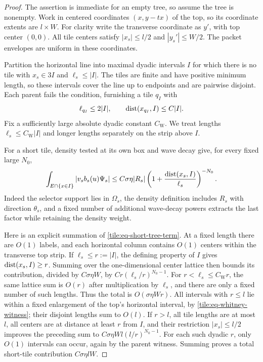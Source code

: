 \begin{proof}
The assertion is immediate for an empty tree, so assume
the tree is nonempty. Work in centered coordinates \((x,y-tx)\) of the
top, so its coordinate extents are \(l\times W\).
For clarity write the transverse coordinate as
\(y'\), with top center \((0,0)\).  All tile
centers satisfy \(|x_s|\leq l/2\) and
\(|y_s'|\leq W/2\).  The packet envelopes are
uniform in these coordinates.

Partition the horizontal line into maximal dyadic
intervals \(I\) for which there is no tile with
\(x_s\in3I\) and \(\ell_s\leq |I|\).  The tiles
are finite and have positive minimum length, so
these intervals cover the line up to endpoints
and are pairwise disjoint.  Each parent fails
the condition, furnishing a tile \(q_I\) with
\begin{equation}\label{tile:eq-whitney-witness}
 \ell_{q_I}\leq2|I|,\qquad
 \operatorname{dist}(x_{q_I},I)\leq C|I|.
\end{equation}
Fix a sufficiently large absolute dyadic constant
\(C_{\mathrm W}\).  We treat lengths
\(\ell_s\leq C_{\mathrm W}|I|\) and longer lengths
separately on the strip above \(I\).

For a short tile, density tested at its own box
and wave decay give, for every fixed large \(N_0\),
\begin{equation}\label{tile:eq-short-tree-term}
 \int_{E\cap\{x\in I\}}
     |v_s b_s(u)\Psi_s|
 \leq C\sigma\eta|R_s|
        \left(1+\frac{\operatorname{dist}(x_s,I)}{\ell_s}\right)^{-N_0}.
\end{equation}
Indeed the selector support lies in \(\Omega_s\),
the density definition includes \(R_s\) with
direction \(\theta_s\), and a fixed number of
additional wave-decay powers extracts the last
factor while retaining the density weight.

Here is an explicit summation of
\eqref{tile:eq-short-tree-term}.  At a fixed
length there are \(O(1)\) labels, and each
horizontal column contains \(O(1)\) centers
within the transverse top strip.  If
\(\ell_s\leq r:=|I|\), the defining property
of \(I\) gives \(\operatorname{dist}(x_s,I)\geq r\).
Summing over the one-dimensional center lattice
then bounds its contribution, divided by
\(C\sigma\eta W\), by
\(C r(\ell_s/r)^{N_0-1}\).
For \(r<\ell_s\leq C_{\mathrm W}r\), the same
lattice sum is \(O(r)\) after multiplication
by \(\ell_s\), and there are only a fixed
number of such lengths.  Thus the total is
\(O(\sigma\eta Wr)\).
All intervals with \(r\leq l\) lie within a
fixed enlargement of the top's horizontal
interval, by \eqref{tile:eq-whitney-witness};
their disjoint lengths sum to \(O(l)\).
If \(r>l\), all tile lengths are at most
\(l\), all centers are at distance at least
\(r\) from \(I\), and their restriction
\(|x_s|\leq l/2\) improves the preceding
sum to
\(C\sigma\eta Wl(l/r)^{N_0-1}\).
For each such dyadic \(r\), only \(O(1)\)
intervals can occur, again by the parent
witness.  Summing proves a total short-tile
contribution \(C\sigma\eta lW\).


\end{proof}
